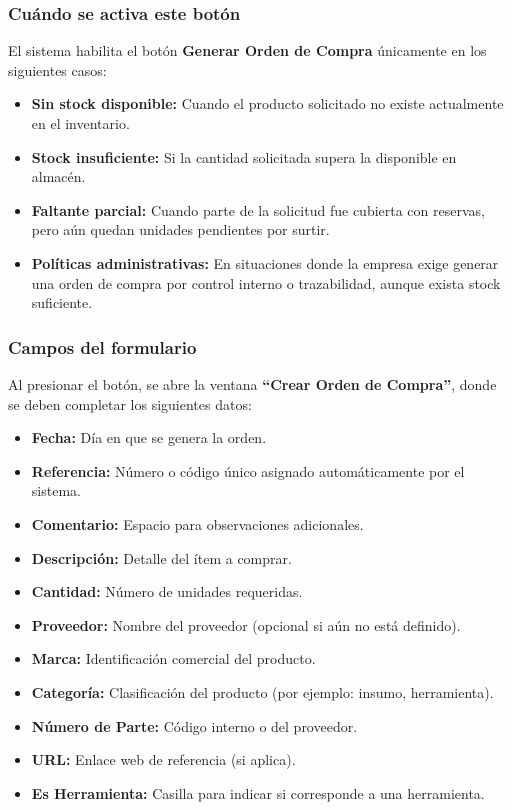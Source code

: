 \subsubsection*{Cuándo se activa este botón}
El sistema habilita el botón \textbf{Generar Orden de Compra} únicamente en los siguientes casos:

\begin{itemize}
    \item \textbf{Sin stock disponible:} Cuando el producto solicitado no existe actualmente en el inventario.
    \item \textbf{Stock insuficiente:} Si la cantidad solicitada supera la disponible en almacén.
    \item \textbf{Faltante parcial:} Cuando parte de la solicitud fue cubierta con reservas, pero aún quedan unidades pendientes por surtir.
    \item \textbf{Políticas administrativas:} En situaciones donde la empresa exige generar una orden de compra por control interno o trazabilidad, aunque exista stock suficiente.
\end{itemize}

\subsubsection*{Campos del formulario}
Al presionar el botón, se abre la ventana \textbf{“Crear Orden de Compra”}, donde se deben completar los siguientes datos:

\begin{itemize}
    \item \textbf{Fecha:} Día en que se genera la orden.
    \item \textbf{Referencia:} Número o código único asignado automáticamente por el sistema.
    \item \textbf{Comentario:} Espacio para observaciones adicionales.
    \item \textbf{Descripción:} Detalle del ítem a comprar.
    \item \textbf{Cantidad:} Número de unidades requeridas.
    \item \textbf{Proveedor:} Nombre del proveedor (opcional si aún no está definido).
    \item \textbf{Marca:} Identificación comercial del producto.
    \item \textbf{Categoría:} Clasificación del producto (por ejemplo: insumo, herramienta).
    \item \textbf{Número de Parte:} Código interno o del proveedor.
    \item \textbf{URL:} Enlace web de referencia (si aplica).
    \item \textbf{Es Herramienta:} Casilla para indicar si corresponde a una herramienta.
\end{itemize}

